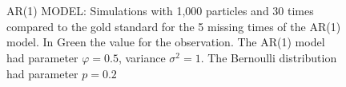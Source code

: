 \begin{figure}
    \\
    \\
    \caption{AR(1) MODEL: Simulations with 1,000 particles and 30 times compared to the gold standard for the 5 missing times of the AR(1) model. In Green the value for the observation. The AR(1) model had parameter $\varphi = 0.5$, variance $\sigma^2 = 1$. The Bernoulli distribution had parameter $p = 0.2$}
\label{fig:1}
\end{figure}


